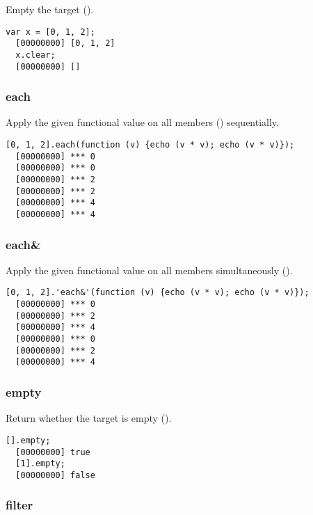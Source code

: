 Empty the target ().

\begin{lstlisting}[caption=List.clear, label=lst:list-clear, float=\floatposh]
  var x = [0, 1, 2];
  [00000000] [0, 1, 2]
  x.clear;
  [00000000] []
\end{lstlisting}

\subsubsection{each}

Apply the given functional value on all members ()
sequentially.

\begin{lstlisting}[caption=List.each, label=lst:list-each, float=\floatposh]
  [0, 1, 2].each(function (v) {echo (v * v); echo (v * v)});
  [00000000] *** 0
  [00000000] *** 0
  [00000000] *** 2
  [00000000] *** 2
  [00000000] *** 4
  [00000000] *** 4
\end{lstlisting}

\subsubsection{each\&}

Apply the given functional value on all members simultaneously
().

\begin{lstlisting}[caption=List.each, label=lst:list-each-and, float=\floatposh]
  [0, 1, 2].'each&'(function (v) {echo (v * v); echo (v * v)});
  [00000000] *** 0
  [00000000] *** 2
  [00000000] *** 4
  [00000000] *** 0
  [00000000] *** 2
  [00000000] *** 4
\end{lstlisting}

\subsubsection{empty}

Return whether the target is empty ().

\begin{lstlisting}[caption=List.empty, label=lst:list-empty, float=\floatposh]
  [].empty;
  [00000000] true
  [1].empty;
  [00000000] false
\end{lstlisting}

\subsubsection{filter}

